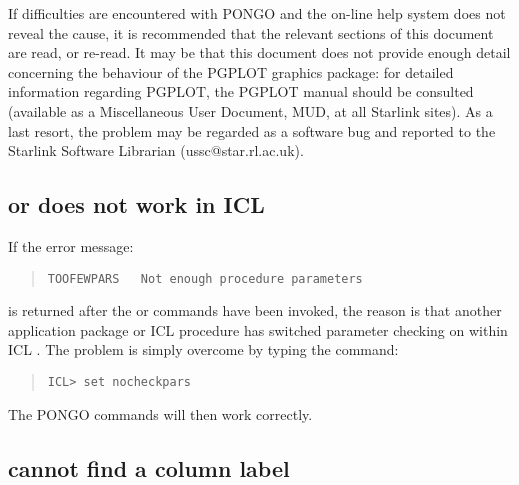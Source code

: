 If difficulties are encountered with PONGO and the on-line help system
does not reveal the cause, it is recommended that the relevant
sections of this document are read, or re-read.  It may be that this
document does not provide enough detail concerning the behaviour of
the PGPLOT graphics package: for detailed information regarding
PGPLOT, the PGPLOT manual should be consulted (available as a
Miscellaneous User Document, MUD, at all Starlink sites).  As a last
resort, the problem may be regarded as a software bug and reported to
the Starlink Software Librarian (ussc@star.rl.ac.uk).


\subsection{ or  does not work in ICL}

If the error message:
\begin{quote}
\begin{verbatim}
TOOFEWPARS   Not enough procedure parameters
\end{verbatim}
\end{quote}
is returned after the  or 
commands have been invoked, the reason is that another application
package or ICL procedure has switched parameter checking on within ICL
.  The problem is simply overcome by typing the command:
\begin{quote}
\begin{verbatim}
ICL> set nocheckpars
\end{verbatim}
\end{quote}
The PONGO commands will then work correctly.

\subsection{ cannot find a column label}

